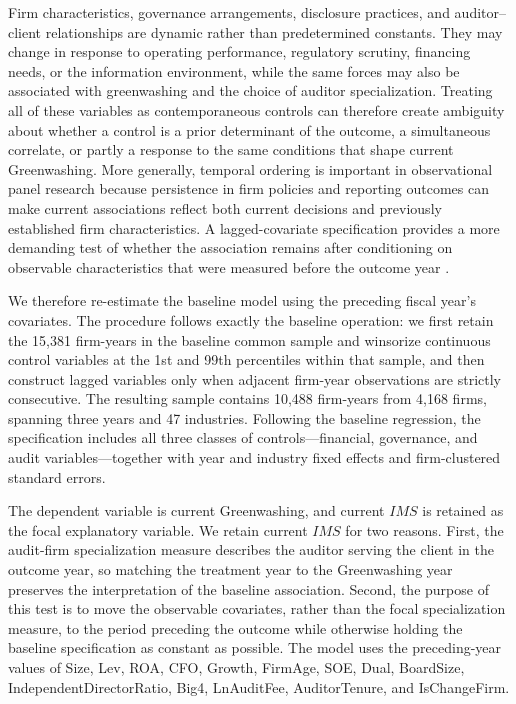 \documentclass[11pt]{article}
\begin{document}
Firm characteristics, governance arrangements, disclosure practices, and auditor--client relationships are dynamic rather than predetermined constants. 
They may change in response to operating performance, regulatory scrutiny, financing needs, or the information environment, while the same forces may also be associated with greenwashing and the choice of auditor specialization. 
Treating all of these variables as contemporaneous controls can therefore create ambiguity about whether a control is a prior determinant of the outcome, a simultaneous correlate, or partly a response to the same conditions that shape current Greenwashing. 
More generally, temporal ordering is important in observational panel research because persistence in firm policies and reporting outcomes can make current associations reflect both current decisions and previously established firm characteristics. 
A lagged-covariate specification provides a more demanding test of whether the association remains after conditioning on observable characteristics that were measured before the outcome year \citep{bates2012crashrisk}.

We therefore re-estimate the baseline model using the preceding fiscal year's covariates. 
The procedure follows exactly the baseline operation: we first retain the 15,381 firm-years in the baseline common sample and winsorize continuous control variables at the 1st and 99th percentiles within that sample, and then construct lagged variables only when adjacent firm-year observations are strictly consecutive. 
The resulting sample contains 10,488 firm-years from 4,168 firms, spanning three years and 47 industries. 
Following the baseline regression, the specification includes all three classes of controls---financial, governance, and audit variables---together with year and industry fixed effects and firm-clustered standard errors.

The dependent variable is current Greenwashing, and current \(IMS\) is retained as the focal explanatory variable. 
We retain current \(IMS\) for two reasons. First, the audit-firm specialization measure describes the auditor serving the client in the outcome year, so matching the treatment year to the Greenwashing year preserves the interpretation of the baseline association. 
Second, the purpose of this test is to move the observable covariates, rather than the focal specialization measure, to the period preceding the outcome while otherwise holding the baseline specification as constant as possible. 
The model uses the preceding-year values of Size, Lev, ROA, CFO, Growth, FirmAge, SOE, Dual, BoardSize, IndependentDirectorRatio, Big4, LnAuditFee, AuditorTenure, and IsChangeFirm.
\end{document}
